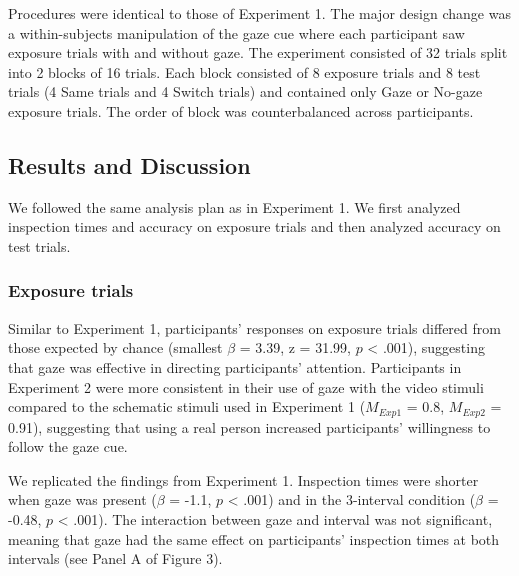 \documentclass[authoryear, review]{elsarticle}
\begin{document}
Procedures were identical to those of Experiment 1. The major design
change was a within-subjects manipulation of the gaze cue where each
participant saw exposure trials with and without gaze. The experiment
consisted of 32 trials split into 2 blocks of 16 trials. Each block
consisted of 8 exposure trials and 8 test trials (4 Same trials and 4
Switch trials) and contained only Gaze or No-gaze exposure trials. The
order of block was counterbalanced across participants.

\subsection{Results and Discussion}\label{results-and-discussion-1}

We followed the same analysis plan as in Experiment 1. We first analyzed
inspection times and accuracy on exposure trials and then analyzed
accuracy on test trials.

\subsubsection{Exposure trials}\label{exposure-trials-1}

Similar to Experiment 1, participants' responses on exposure trials
differed from those expected by chance (smallest \(\beta\) = 3.39, z =
31.99, \(p\) \textless{} .001), suggesting that gaze was effective in
directing participants' attention. Participants in Experiment 2 were
more consistent in their use of gaze with the video stimuli compared to
the schematic stimuli used in Experiment 1 (\(M_{Exp1}\) = 0.8,
\(M_{Exp2}\) = 0.91), suggesting that using a real person increased
participants' willingness to follow the gaze cue.

We replicated the findings from Experiment 1. Inspection times were
shorter when gaze was present (\(\beta\) = -1.1, \(p\) \textless{} .001)
and in the 3-interval condition (\(\beta\) = -0.48, \(p\) \textless{}
.001). The interaction between gaze and interval was not significant,
meaning that gaze had the same effect on participants' inspection times
at both intervals (see Panel A of Figure 3).
\end{document}
